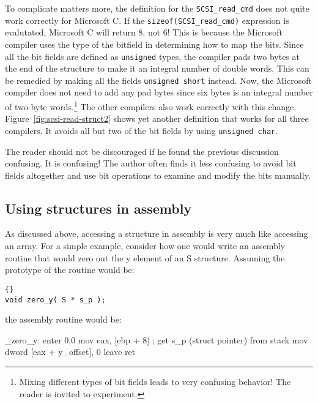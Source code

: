 To complicate matters more, the definition for the
\lstinline|SCSI_read_cmd| does not quite work correctly for Microsoft
C. If the \lstinline|sizeof(SCSI_read_cmd)| expression is evalutated,
Microsoft C will return 8, not 6! This is because the Microsoft
compiler uses the type of the bitfield in determining how to map the
bits. Since all the bit fields are defined as \lstinline|unsigned|
types, the compiler pads two bytes at the end of the structure to make
it an integral number of double words. This can be remedied by making
all the fields \lstinline|unsigned short| instead. Now, the Microsoft
compiler does not need to add any pad bytes since six bytes is an
integral number of two-byte words.\footnote{Mixing different types of
bit fields leads to very confusing behavior! The reader is invited to
experiment.} The other compilers also work correctly with this
change. Figure~\ref{fig:scsi-read-struct2} shows yet another definition
that works for all three compilers. It avoids all but two of the bit
fields by using \lstinline|unsigned char|.

The reader should not be discouraged if he found the previous
discussion confusing.  It is confusing! The author often finds it less
confusing to avoid bit fields altogether and use bit operations to
examine and modify the bits manually.



\subsection{Using structures in assembly}

As discussed above, accessing a structure in assembly is very much
like accessing an array. For a simple example, consider how one would
write an assembly routine that would zero out the {\code y} element
of an {\code S} structure. Assuming the prototype of the routine would be:
\begin{lstlisting}[stepnumber=0]{}
void zero_y( S * s_p );
\end{lstlisting}
\noindent the assembly routine would be:
\begin{AsmCodeListing}
_zero_y:
      enter  0,0
      mov    eax, [ebp + 8]      ; get s_p (struct pointer) from stack
      mov    dword [eax + y_offset], 0
      leave
      ret
\end{AsmCodeListing}

